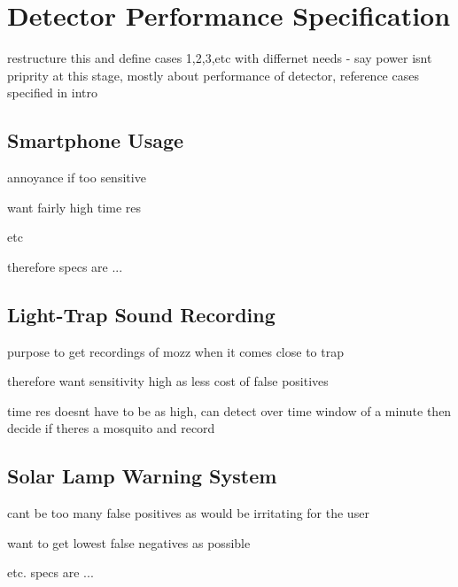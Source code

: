 \section{Detector Performance Specification}
\label{sec:exp-spec}
    restructure this and define cases 1,2,3,etc with differnet needs - say power isnt priprity at this stage, mostly about performance of detector, reference cases specified in intro
    \subsection{Smartphone Usage}
    \label{subsec:exp-spec-phone}
        \begin{sitemize}
            \item{annoyance if too sensitive}
            \item{want fairly high time res}
            \item{etc}
            \item{therefore specs are ...}
        \end{sitemize}
    
    \subsection{Light-Trap Sound Recording}
    \label{subsec:exp-spec-trap}
        \begin{sitemize}
            \item{purpose to get recordings of mozz when it comes close to trap}
            \item{therefore want sensitivity high as less cost of false positives}
            \item{time res doesnt have to be as high, can detect over time window of a minute then decide if theres a mosquito and record}
        \end{sitemize}
        
    \subsection{Solar Lamp Warning System}
    \label{subsec:exp-spec-lamp}
        \begin{sitemize}
            \item{cant be too many false positives as would be irritating for the user}
            \item{want to get lowest false negatives as possible}
            \item{etc. specs are ...}
        \end{sitemize}